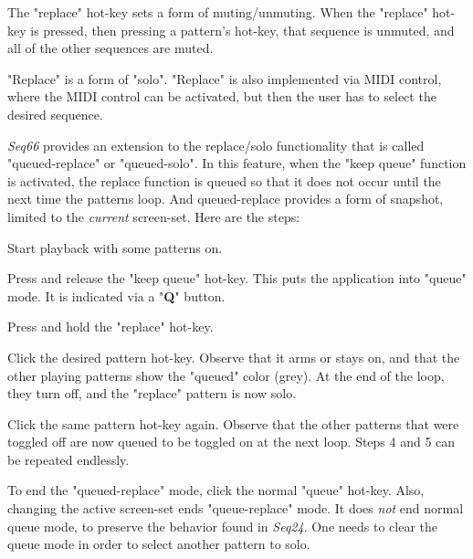    The "replace" hot-key sets a form of muting/unmuting.
   When the "replace" hot-key is
   pressed, then pressing a pattern's hot-key,
   that sequence is unmuted, and all of the other sequences are muted.

   "Replace" is a form of "solo".
   "Replace" is also implemented via MIDI control,
   where the MIDI control can be activated, but then the user has to select
   the desired sequence.  

   \textsl{Seq66} provides an extension to the replace/solo functionality
   that is called "queued-replace" or "queued-solo".  In this feature, when
   the "keep queue" function is activated, the replace function is queued so
   that it does not occur until the next time the patterns loop.
   And queued-replace provides a form of snapshot, limited to the
   \textsl{current} screen-set.
   Here are the steps:

   \begin{enumber}
      \item Start playback with some patterns on. 
      \item Press and release
         the "keep queue" hot-key.  This puts the application into "queue" mode.
         It is indicated via a "\textbf{Q}" button.
      \item Press and hold the "replace" hot-key.
      \item Click the desired pattern hot-key.  Observe that it arms or
         stays on, and that the other playing patterns show the "queued" color
         (grey).  At the end of the loop, they turn off, and the "replace"
         pattern is now solo.
      \item Click the same pattern hot-key again.  Observe that the other
         patterns that were toggled off are now queued to be toggled on at the
         next loop.  Steps 4 and 5 can be repeated endlessly.
      \item To end
         the "queued-replace" mode, click the normal "queue"
         hot-key.  Also, changing the active screen-set ends "queue-replace"
         mode.  It does \textsl{not} end normal queue mode, to preserve the
         behavior found in \textsl{Seq24}.
         One needs to clear the queue mode in order to select another pattern
         to solo.
   \end{enumber}

